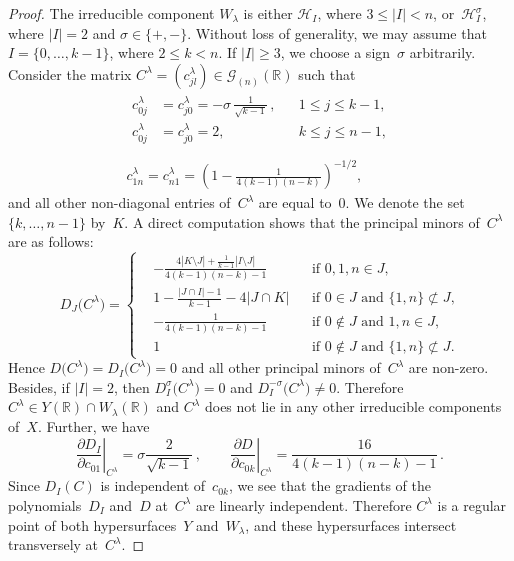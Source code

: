 \documentclass[reqno,tbtags,12pt]{amsart}
\numberwithin{equation}{section}
\newcommand{\R}{\mathbb{R}}
\newcommand{\CH}{\mathcal{H}}
\newcommand{\CG}{\mathcal{G}}
\theoremstyle{definition}
\begin{document}
\begin{proof}
The irreducible component $W_{\lambda}$ is either $\CH_I$, where $3\le |I|<n$, or~$\CH_I^{\sigma}$, where $|I|=2$ and $\sigma\in\{+,-\}$. Without loss of generality, we may assume that $I=\{0,\ldots,k-1\}$, where $2\le k<n$. If $|I|\ge 3$, we choose a sign~$\sigma$ arbitrarily. Consider the matrix $C^{\lambda}=(c_{jl}^{\lambda})\in\CG_{(n)}(\R)$ such that
\begin{gather*}
\begin{aligned}
c_{0j}^{\lambda}&=c_{j0}^{\lambda}=
-\sigma\,\frac{1}{\sqrt{k-1}}\,,&&1\le j\le k-1,\\
c_{0j}^{\lambda}&=c_{j0}^{\lambda}=2,&&k\le j\le n-1,\\
\end{aligned}\\
c_{1n}^{\lambda}=c_{n1}^{\lambda}=\left(1-\frac{1}{4(k-1)(n-k)}\right)^{-1/2},
\end{gather*}
and all other non-diagonal entries of~$C^{\lambda}$ are equal to~$0$.
We denote the set $\{k,\ldots,n-1\}$ by~$K$. A direct computation shows that the principal minors of~$C^{\lambda}$ are as follows:
$$
D_J\bigl(C^{\lambda}\bigr)=\left\{
\begin{aligned}
&-\frac{4|K\setminus J|+\frac{1}{k-1}|I\setminus J|}{4(k-1)(n-k)-1}& &\text{if $0,1,n\in J$,}\\
&1-\frac{|J\cap I|-1}{k-1}-4|J\cap K|& &\text{if $0\in J$ and $\{1,n\}\not\subset J$,}\\
&-\frac{1}{4(k-1)(n-k)-1}& &\text{if $0\notin J$ and $1,n\in J$,}\\
&1&&\text{if $0\notin J$ and $\{1,n\}\not\subset J$.}
\end{aligned}
\right.
$$
Hence $D\bigl(C^{\lambda}\bigr)=D_I\bigl(C^{\lambda}\bigr)=0$ and all other principal minors of~$C^{\lambda}$ are non-zero. Besides, if $|I|=2$, then $D_I^{\sigma}\bigl(C^{\lambda}\bigr)=0$ and $D_I^{-\sigma}\bigl(C^{\lambda}\bigr)\ne0$. Therefore $C^{\lambda}\in Y(\R)\cap W_{\lambda}(\R)$ and $C^{\lambda}$ does not lie in any other irreducible components of~$X$. Further, we have
$$
\left.\frac{\partial D_I}{\partial c_{01}}\right|_{C^{\lambda}}=\sigma \frac{2}{\sqrt{k-1}}\,,\qquad\left.\frac{\partial D}{\partial c_{0k}}\right|_{C^{\lambda}}=\frac{16}{4(k-1)(n-k)-1}\,.
$$
Since $D_I(C)$ is independent of~$c_{0k}$, we see that  the gradients of the polynomials~$D_I$ and~$D$ at~$C^{\lambda}$ are  linearly independent. Therefore $C^{\lambda}$ is a regular point of both hypersurfaces~$Y$ and~$W_{\lambda}$, and these hypersurfaces intersect transversely at~$C^{\lambda}$.
\end{proof}
\end{document}
